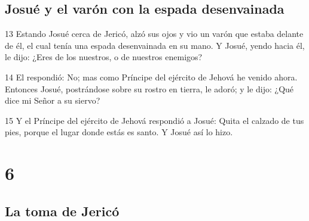 \section*{Josué y el varón con la espada desenvainada}

\par 13 Estando Josué cerca de Jericó, alzó sus ojos y vio un varón que estaba delante de él, el cual tenía una espada desenvainada en su mano. Y Josué, yendo hacia él, le dijo: ¿Eres de los nuestros, o de nuestros enemigos?
\par 14 El respondió: No; mas como Príncipe del ejército de Jehová he venido ahora. Entonces Josué, postrándose sobre su rostro en tierra, le adoró; y le dijo: ¿Qué dice mi Señor a su siervo?
\par 15 Y el Príncipe del ejército de Jehová respondió a Josué: Quita el calzado de tus pies, porque el lugar donde estás es santo. Y Josué así lo hizo.

\chapter{6}

\section*{La toma de Jericó}

